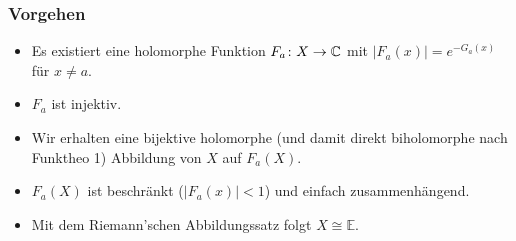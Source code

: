 \begin{frame}
    \frametitle{Vorgehen}
    \begin{itemize}
        \item Es existiert eine holomorphe Funktion $F_a\colon X \to \mathbb{C}$ mit $|F_a(x)| = e^{-G_a(x)}$ für $x \neq a$.
        \item $F_a$ ist injektiv.
        \item Wir erhalten eine bijektive holomorphe (und damit direkt biholomorphe nach Funktheo 1) Abbildung von $X$ auf $F_a(X)$.
        \item $F_a(X)$ ist beschränkt ($|F_a(x)| < 1$) und einfach zusammenhängend.
        \item Mit dem Riemann’schen Abbildungssatz folgt $X \cong \mathbb{E}$.
    \end{itemize}
\end{frame}